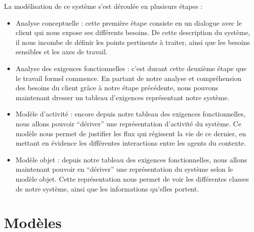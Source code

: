\documentclass[12pt,a4paper]{article}
\begin{document}
La modélisation de ce système s'est déroulée en plusieurs étapes :
\begin{itemize}
        \item Analyse conceptuelle : cette première étape consiste en un
            dialogue avec le client qui nous expose ses différents besoins. De
            cette description du système, il nous incombe de définir les points
            pertinents à traiter, ainsi que les besoins sensibles et les axes de
            travail.
        \item Analyse des exigences fonctionnelles : c'est durant cette deuxième
            étape que le travail formel commence. En partant de notre
            analyse et compréhension des besoins du client grâce à notre étape
            précédente, nous pouvons maintenant dresser un tableau d'exigences
            représentant notre système.
        \item Modèle d'activité : encore depuis notre tableau des exigences
            fonctionnelles, nous allons pouvoir \enquote{dériver} une
            représentation d'activité du système. Ce modèle nous permet de
            justifier les flux qui régissent la vie de ce dernier, en mettant en
            évidence les différentes interactions entre les agents du contexte.
        \item Modèle objet : depuis notre tableau des exigences fonctionnelles,
            nous allons maintenant pouvoir en \enquote{dériver} une
            représentation du système selon le modèle objet. Cette
            représentation nous permet de voir les différentes classes de
            notre système, ainsi que les informations qu'elles portent.
\end{itemize}

\section{Modèles}
\end{document}

